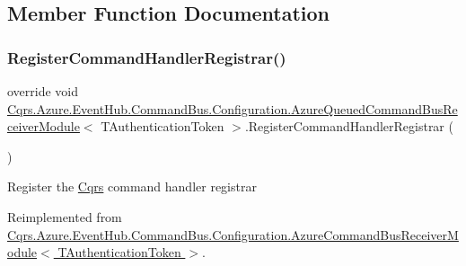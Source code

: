 \subsection{Member Function Documentation}
\mbox{\label{classCqrs_1_1Azure_1_1EventHub_1_1CommandBus_1_1Configuration_1_1AzureQueuedCommandBusReceiverModule_a30d8ea5555bbb38bfddc6b5aa1e3dd1c_a30d8ea5555bbb38bfddc6b5aa1e3dd1c}} 
\subsubsection{\texorpdfstring{Register\+Command\+Handler\+Registrar()}{RegisterCommandHandlerRegistrar()}}
{\footnotesize\ttfamily override void \hyperlink{classCqrs_1_1Azure_1_1EventHub_1_1CommandBus_1_1Configuration_1_1AzureQueuedCommandBusReceiverModule}{Cqrs.\+Azure.\+Event\+Hub.\+Command\+Bus.\+Configuration.\+Azure\+Queued\+Command\+Bus\+Receiver\+Module}$<$ T\+Authentication\+Token $>$.Register\+Command\+Handler\+Registrar (\begin{DoxyParamCaption}{ }\end{DoxyParamCaption})\hspace{0.3cm}{\ttfamily [virtual]}}



Register the \hyperlink{namespaceCqrs}{Cqrs} command handler registrar 



Reimplemented from \hyperlink{classCqrs_1_1Azure_1_1EventHub_1_1CommandBus_1_1Configuration_1_1AzureCommandBusReceiverModule_a62975fe00dd6c7f62b5eba6bb6eed7c4_a62975fe00dd6c7f62b5eba6bb6eed7c4}{Cqrs.\+Azure.\+Event\+Hub.\+Command\+Bus.\+Configuration.\+Azure\+Command\+Bus\+Receiver\+Module$<$ T\+Authentication\+Token $>$}.

